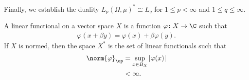 \documentclass[10pt]{mypackage}
\begin{document}
Finally, we establish the duality $L_p\left( \Omega,\mu \right)^{\ast} \cong L_q$ for $1\leq p < \infty$ and $1\leq q \leq \infty$.
\begin{definition}
  A linear functional on a vector space $X$ is a function $\varphi\colon X\rightarrow \C$ such that
  \begin{align*}
    \varphi\left( x + \beta y \right) = \varphi\left( x \right) + \beta \varphi\left( y \right).
  \end{align*}
  If $X$ is normed, then the space $X^{\ast}$ is the set of linear functionals such that
  \begin{align*}
    \norm{\varphi}_{\op} &= \sup_{x\in B_{X}}\left\vert \varphi(x) \right\vert\\
                         & < \infty.
  \end{align*}
\end{definition}
\end{document}
